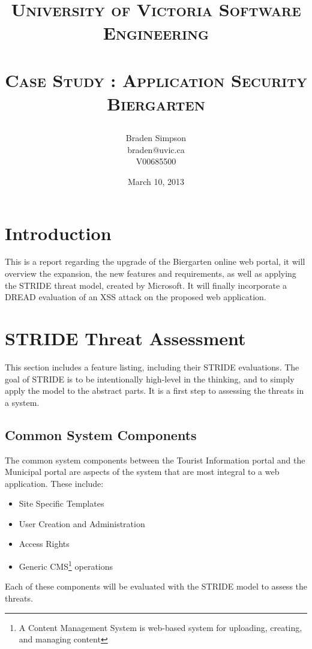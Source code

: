\documentclass{article}
\title{
\large{\textsc{University of Victoria Software Engineering}}\huge\\ [0pt] %
\horrule{0.5pt}\\[0.4cm]
\textsc{Case Study : Application Security\\Biergarten}\\
\author{Braden Simpson\\braden@uvic.ca\\V00685500}
\date{March 10, 2013}
}
\numberwithin{equation}{section} %
\numberwithin{figure}{section} %
\numberwithin{table}{section} %
\begin{document}
\maketitle %


\section{Introduction}
\label{sec:intro}
This is a report regarding the upgrade of the Biergarten online web portal, it will overview the expansion, the new features and requirements, as well as applying the STRIDE\cite{owaspstride} threat model, created by Microsoft.  It will finally incorporate a DREAD\cite{owaspdread} evaluation of an XSS attack on the proposed web application.

\section{STRIDE Threat Assessment}
\label{sec:stride}
This section includes a feature listing, including their STRIDE evaluations.  The goal of STRIDE is to be intentionally high-level in the thinking, and to simply apply the model to the abstract parts.  It is a first step to assessing the threats in a system.

\subsection{Common System Components}
\label{sec:components}
The common system components between the Tourist Information portal and the Municipal portal are aspects of the system that are most integral to a web application.  These include:
\begin{itemize}
	\item Site Specific Templates
	\item User Creation and Administration
	\item Access Rights
	\item Generic CMS\footnote{A Content Management System is web-based system for uploading, creating, and managing content} operations 
\end{itemize}

Each of these components will be evaluated with the STRIDE model to assess the threats. 
\end{document}
